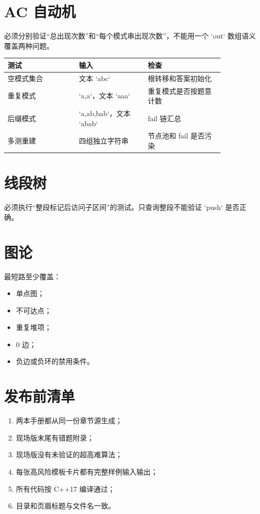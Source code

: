 \section{AC 自动机}

必须分别验证“总出现次数”和“每个模式串出现次数”，不能用一个 `out` 数组语义覆盖两种问题。

\begin{tabular}{p{0.28\linewidth}|p{0.27\linewidth}|p{0.30\linewidth}}
\textbf{测试} & \textbf{输入} & \textbf{检查}\\ \hline
空模式集合 & 文本 `abc` & 根转移和答案初始化\\
重复模式 & `a,a`，文本 `aaa` & 重复模式是否按题意计数\\
后缀模式 & `a,ab,bab`，文本 `abab` & fail 链汇总\\
多测重建 & 四组独立字符串 & 节点池和 fail 是否污染
\end{tabular}

\section{线段树}

必须执行“整段标记后访问子区间”的测试。只查询整段不能验证 `push` 是否正确。

\section{图论}

最短路至少覆盖：

\begin{itemize}
\item 单点图；
\item 不可达点；
\item 重复堆项；
\item 0 边；
\item 负边或负环的禁用条件。
\end{itemize}

\section{发布前清单}

\begin{enumerate}
\item 两本手册都从同一份章节源生成；
\item 现场版末尾有错题附录；
\item 现场版没有未验证的超高难算法；
\item 每张高风险模板卡片都有完整样例输入输出；
\item 所有代码按 C++17 编译通过；
\item 目录和页眉标题与文件名一致。
\end{enumerate}


